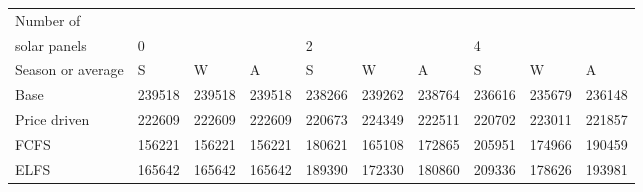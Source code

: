 \begin{table}[h] 
\centering 
\begin{tabular}{l|lll|lll|lll}Number of \\ solar panels&0& & &2& & &4& & \\ \hline 
Season or average & S & W & A & S & W & A & S & W & A \\ \hline 
Base&239518&239518&239518&238266&239262&238764&236616&235679&236148 \\ 
Price driven&222609&222609&222609&220673&224349&222511&220702&223011&221857 \\ 
FCFS&156221&156221&156221&180621&165108&172865&205951&174966&190459 \\ 
ELFS&165642&165642&165642&189390&172330&180860&209336&178626&193981 \\ 
\end{tabular} 
\end{table}